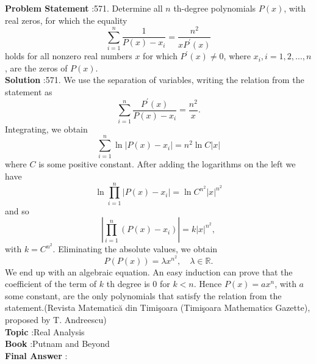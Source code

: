 \documentclass[10pt]{article}
\begin{document}
\textbf{Problem Statement} :571. Determine all $n$ th-degree polynomials $P(x)$, with real zeros, for which the equality$$ \sum_{i=1}^{n} \frac{1}{P(x)-x_{i}}=\frac{n^{2}}{x P^{\prime}(x)} $$holds for all nonzero real numbers $x$ for which $P^{\prime}(x) \neq 0$, where $x_{i}, i=1,2, \ldots, n$, are the zeros of $P(x)$.\\
\textbf{Solution} :571. We use the separation of variables, writing the relation from the statement as$$ \sum_{i=1}^{n} \frac{P^{\prime}(x)}{P(x)-x_{i}}=\frac{n^{2}}{x} . $$Integrating, we obtain $$ \sum_{i=1}^{n} \ln \left|P(x)-x_{i}\right|=n^{2} \ln C|x| $$where $C$ is some positive constant. After adding the logarithms on the left we have$$ \ln \prod_{i=1}^{n}\left|P(x)-x_{i}\right|=\ln C^{n^{2}}|x|^{n^{2}} $$and so$$ \left|\prod_{i=1}^{n}\left(P(x)-x_{i}\right)\right|=k|x|^{n^{2}}, $$with $k=C^{n^{2}}$. Eliminating the absolute values, we obtain$$ P(P(x))=\lambda x^{n^{2}}, \quad \lambda \in \mathbb{R} . $$We end up with an algebraic equation. An easy induction can prove that the coefficient of the term of $k$ th degree is 0 for $k<n$. Hence $P(x)=a x^{n}$, with $a$ some constant, are the only polynomials that satisfy the relation from the statement.(Revista Matematică din Timişoara (Timişoara Mathematics Gazette), proposed by T. Andreescu)\\
\textbf{Topic} :Real Analysis\\
\textbf{Book} :Putnam and Beyond\\
\textbf{Final Answer} :\\
\end{document}
